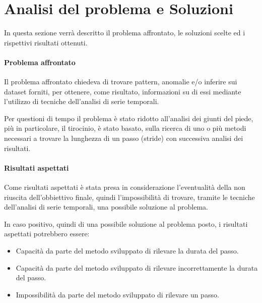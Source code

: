 \section{Analisi del problema e Soluzioni}
In questa sezione verrà descritto il problema affrontato, le soluzioni scelte ed i rispettivi
risultati ottenuti.

\paragraph{Problema affrontato}
Il problema affrontato chiedeva di trovare pattern, anomalie e/o inferire sui dataset forniti, 
per ottenere, come risultato, informazioni su di essi mediante l'utilizzo di tecniche 
dell'analisi di serie temporali.

Per questioni di tempo il problema è stato ridotto all'analisi dei giunti del piede, più in particolare,
il tirocinio, è stato basato, sulla ricerca di uno o più metodi necessari a trovare la lunghezza di un passo
(stride) con successiva analisi dei risultati.



\paragraph{Risultati aspettati}
\begin{sloppypar}
Come risultati aspettati è stata presa in considerazione l'eventualità della non riuscita dell'obbiettivo finale,
quindi l'impossibilità di trovare, tramite le tecniche dell'analisi di serie temporali, una possibile soluzione
al problema.
\end{sloppypar}

In caso positivo, quindi di una possibile soluzione al problema posto, i risultati aspettati potrebbero essere:
\begin{itemize}
    \setlength\itemsep{-0.5em}
    \item Capacità da parte del metodo sviluppato di rilevare la durata del passo.
    \item Capacità da parte del metodo sviluppato di rilevare incorrettamente la durata del passo.
    \item Impossibilità da parte del metodo sviluppato di rilevare un passo.
\end{itemize}

